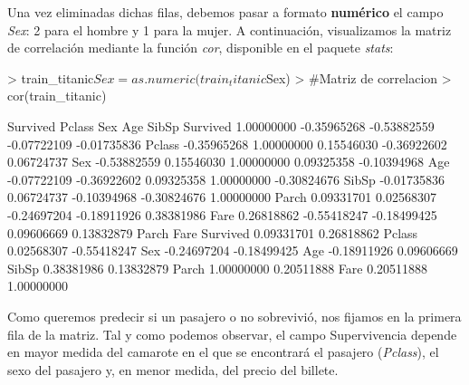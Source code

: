 \documentclass [a4paper] {article}
\begin{document}
Una vez eliminadas dichas filas, debemos pasar a formato \textbf{numérico} el campo \textit{Sex}: 2 para el hombre y 1 para la mujer. A continuación, visualizamos la matriz de correlación mediante la función \textit{cor}, disponible en el paquete \textit{stats}:
\begin{Schunk}
\begin{Sinput}
> train_titanic$Sex = as.numeric(train_titanic$Sex)
> #Matriz de correlacion
> cor(train_titanic)
\end{Sinput}
\begin{Soutput}
            Survived      Pclass         Sex         Age       SibSp
Survived  1.00000000 -0.35965268 -0.53882559 -0.07722109 -0.01735836
Pclass   -0.35965268  1.00000000  0.15546030 -0.36922602  0.06724737
Sex      -0.53882559  0.15546030  1.00000000  0.09325358 -0.10394968
Age      -0.07722109 -0.36922602  0.09325358  1.00000000 -0.30824676
SibSp    -0.01735836  0.06724737 -0.10394968 -0.30824676  1.00000000
Parch     0.09331701  0.02568307 -0.24697204 -0.18911926  0.38381986
Fare      0.26818862 -0.55418247 -0.18499425  0.09606669  0.13832879
               Parch        Fare
Survived  0.09331701  0.26818862
Pclass    0.02568307 -0.55418247
Sex      -0.24697204 -0.18499425
Age      -0.18911926  0.09606669
SibSp     0.38381986  0.13832879
Parch     1.00000000  0.20511888
Fare      0.20511888  1.00000000
\end{Soutput}
\end{Schunk}

Como queremos predecir si un pasajero o no sobrevivió, nos fijamos en la primera fila de la matriz. Tal y como podemos observar, el campo Supervivencia depende en mayor medida del camarote en el que se encontrará el pasajero (\textit{Pclass}), el sexo del pasajero y, en menor medida, del precio del billete.
\end{document}
